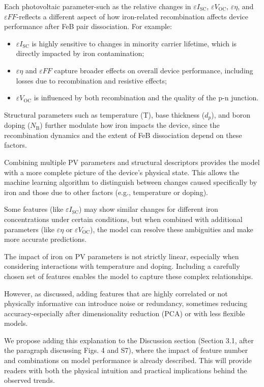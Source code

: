\documentclass[a4paper,fleqn]{cas-sc}
\begin{document}
Each photovoltaic parameter-such as the relative changes in $\varepsilon I_\mathrm{SC}$, $\varepsilon V_\mathrm{OC}$, $\varepsilon \eta$, and $\varepsilon FF$-reflects a different aspect of how iron-related recombination affects device performance after FeB pair dissociation. For example:
\begin{itemize}
    \item $\varepsilon I_\mathrm{SC}$ is highly sensitive to changes in minority carrier lifetime, which is directly impacted by iron contamination;
    \item $\varepsilon \eta$ and $\varepsilon FF$ capture broader effects on overall device performance, including losses due to recombination and resistive effects;
    \item $\varepsilon V_\mathrm{OC}$ is influenced by both recombination and the quality of the p-n junction.
\end{itemize}

Structural parameters such as temperature (T), base thickness ($d_p$), and boron doping ($N_\mathrm{B}$) further modulate how iron impacts the device, since the recombination dynamics and the extent of FeB dissociation depend on these factors.


Combining multiple PV parameters and structural descriptors provides the model with a more complete picture of the device’s physical state. This allows the machine learning algorithm to distinguish between changes caused specifically by iron and those due to other factors (e.g., temperature or doping).


Some features (like $\varepsilon I_\mathrm{SC}$) may show similar changes for different iron concentrations under certain conditions, but when combined with additional parameters (like $\varepsilon \eta$ or $\varepsilon V_\mathrm{OC}$), the model can resolve these ambiguities and make more accurate predictions.


The impact of iron on PV parameters is not strictly linear, especially when considering interactions with temperature and doping. 
Including a carefully chosen set of features enables the model to capture these complex relationships.


However, as discussed, adding features that are highly correlated or not physically informative can introduce noise or redundancy, sometimes reducing accuracy-especially after dimensionality reduction (PCA) or with less flexible models.


We propose adding this explanation to the Discussion section (Section 3.1, after the paragraph discussing Figs. 4 and S7), where the impact of feature number and combinations on model performance is already described. 
This will provide readers with both the physical intuition and practical implications behind the observed trends.
\end{document}
